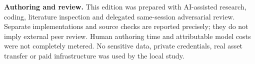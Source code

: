 \textbf{Authoring and review.} This edition was prepared with AI-assisted research, coding, literature inspection and delegated same-session adversarial review. Separate implementations and source checks are reported precisely; they do not imply external peer review. Human authoring time and attributable model costs were not completely metered. No sensitive data, private credentials, real asset transfer or paid infrastructure was used by the local study.
